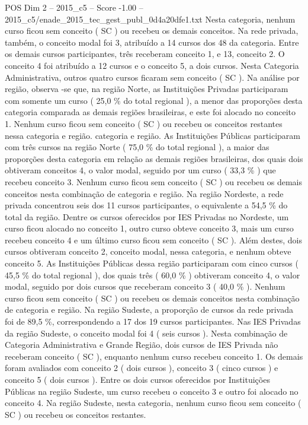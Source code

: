 \begin{textsample}{POS Dim 2 – 2015\_c5 – Score -1.00 – 2015\_c5/enade\_2015\_tec\_gest\_publ\_0d4a20dfe1.txt}
Nesta categoria, nenhum curso ficou sem conceito ( SC ) ou recebeu os demais conceitos.
Na rede privada, também, o conceito modal foi 3, atribuído a 14 cursos dos 48 da categoria.
Entre os demais cursos participantes, três receberam conceito 1, e 13, conceito 2.
O conceito 4 foi atribuído a 12 cursos e o conceito 5, a dois cursos.
Nesta Categoria Administrativa, outros quatro cursos ficaram sem conceito ( SC ).
Na análise por região, observa -se que, na região Norte, as Instituições Privadas participaram com somente um curso ( 25,0 \% do total regional ), a menor das proporções desta categoria comparada as demais regiões brasileiras, e este foi alocado no conceito 1.
Nenhum curso ficou sem conceito ( SC ) ou recebeu os conceitos restantes nessa categoria e região. categoria e região.
As Instituições Públicas participaram com três cursos na região Norte ( 75,0 \% do total regional ), a maior das proporções desta categoria em relação as demais regiões brasileiras, dos quais dois obtiveram conceitos 4, o valor modal, seguido por um curso ( 33,3 \% ) que recebeu conceito 3.
Nenhum curso ficou sem conceito ( SC ) ou recebeu os demais conceitos nesta combinação de categoria e região.
Na região Nordeste, a rede privada concentrou seis dos 11 cursos participantes, o equivalente a 54,5 \% do total da região.
Dentre os cursos oferecidos por IES Privadas no Nordeste, um curso ficou alocado no conceito 1, outro curso obteve conceito 3, mais um curso recebeu conceito 4 e um último curso ficou sem conceito ( SC ).
Além destes, dois cursos obtiveram conceito 2, conceito modal, nessa categoria, e nenhum obteve conceito 5.
As Instituições Públicas dessa região participaram com cinco cursos ( 45,5 \% do total regional ), dos quais três ( 60,0 \% ) obtiveram conceito 4, o valor modal, seguido por dois cursos que receberam conceito 3 ( 40,0 \% ).
Nenhum curso ficou sem conceito ( SC ) ou recebeu os demais conceitos nesta combinação de categoria e região.
Na região Sudeste, a proporção de cursos da rede privada foi de 89,5 \%, correspondendo a 17 dos 19 cursos participantes.
Nas IES Privadas da região Sudeste, o conceito modal foi 4 ( seis cursos ).
Nesta combinação de Categoria Administrativa e Grande Região, dois cursos de IES Privada não receberam conceito ( SC ), enquanto nenhum curso recebeu conceito 1.
Os demais foram avaliados com conceito 2 ( dois cursos ), conceito 3 ( cinco cursos ) e conceito 5 ( dois cursos ).
Entre os dois cursos oferecidos por Instituições Públicas na região Sudeste, um curso recebeu o conceito 3 e outro foi alocado no conceito 4.
Na região Sudeste, nesta categoria, nenhum curso ficou sem conceito ( SC ) ou recebeu os conceitos restantes.

\end{textsample}
